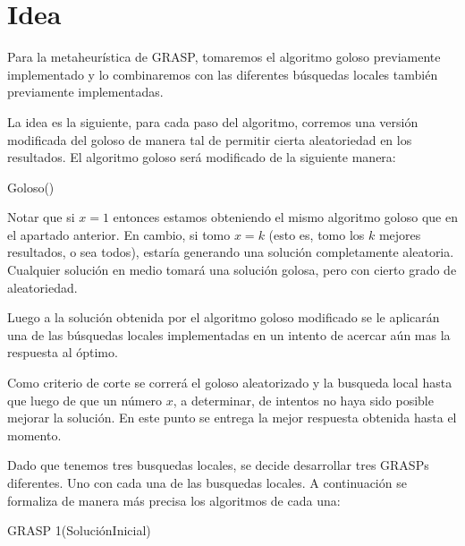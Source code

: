 \section{Idea}


Para la metaheurística de GRASP, tomaremos el algoritmo goloso previamente implementado y lo combinaremos con las diferentes búsquedas locales también previamente implementadas.

La idea es la siguiente, para cada paso del algoritmo, corremos una versión modificada del goloso de manera tal de permitir cierta aleatoriedad en los resultados. El algoritmo goloso será modificado de la siguiente manera:

\begin{algorithm}
  \begin{algorithmic}[1]\parskip=1mm
 \caption{ Goloso()}
\end{algorithmic}
\end{algorithm} 

Notar que si $x=1$ entonces estamos obteniendo el mismo algoritmo goloso que en el apartado anterior. En cambio, si tomo $x = k$ (esto es, tomo los $k$ mejores resultados, o sea todos), estaría generando una solución completamente aleatoria. Cualquier solución en medio tomará una solución golosa, pero con cierto grado de aleatoriedad.

Luego a la solución obtenida por el algoritmo goloso modificado se le aplicarán una de las búsquedas locales implementadas en un intento de acercar aún mas la respuesta al óptimo.

Como criterio de corte se correrá el goloso aleatorizado y la busqueda local hasta que luego de que un número $x$, a determinar, de intentos no haya sido posible mejorar la solución. En este punto se entrega la mejor respuesta obtenida hasta el momento.

Dado que tenemos tres busquedas locales, se decide desarrollar tres GRASPs diferentes. Uno con cada una de las busquedas locales. A continuación se formaliza de manera más precisa los algoritmos de cada una:

\begin{algorithm}
  	\begin{algorithmic}[1]\parskip=1mm
		 \caption{ GRASP 1(SoluciónInicial) }
	\end{algorithmic}
\end{algorithm}

